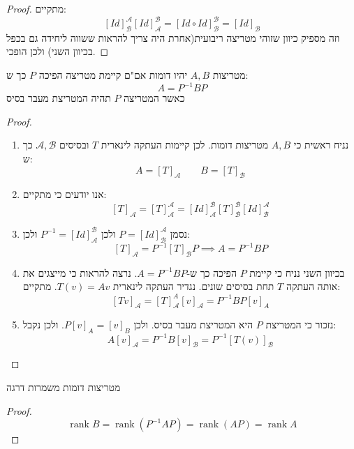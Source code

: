 \documentclass{tstextbook}
\begin{document}
\begin{proof}
מתקיים:
$$[Id]_{\mathcal{B} }^{\mathcal{A} }[Id]_{\mathcal{A} }^{\mathcal{B} }=\left[ Id\circ  Id \right]_{\mathcal{B
} }^{\mathcal{B} }=[Id]_{\mathcal{B} }$$
וזה מספיק כיוון שזוהי מטריצה ריבועית(אחרת היה צריך להראות ששווה ליחידה גם בכפל בכיוון השני) ולכן הופכי.

\end{proof}
\begin{proposition}
מטריצות \(A,B\) יהיו דומות אם"ם קיימת מטריצה הפיכה \(P\) כך ש:
$$A=P ^{-1}BP$$
כאשר המטריצה \(P\) תהיה המטריצת מעבר בסיס

\end{proposition}
\begin{proof}
  \begin{enumerate}
    \item נניח ראשית כי \(A,B\) מטריצות דומות. לכן קיימות העתקה לינארית \(T\) ובסיסים \(\mathcal{A},\mathcal{B}\) כך ש: 
$$A=[T]_{\mathcal{A} }\qquad B=[T]_{\mathcal{B} }$$


    \item אנו יודעים כי מתקיים: 
$$[T]_{\mathcal{A} }=[T]_{\mathcal{A} }^{\mathcal{A} }=[Id]_{\mathcal{A} }^{\mathcal{B} }[T]_{\mathcal{B} }^{\mathcal{B} } [Id]_{\mathcal{B} }^{\mathcal{A} }$$


    \item נסמן \(P=[Id]_{\mathcal{B}}^{\mathcal{A}}\) ולכן \(P ^{-1}=[Id]_{\mathcal{A}}^{\mathcal{B}}\) ולכן: 
$$[T]_{\mathcal{A} }=P ^{-1} [T]_{\mathcal{B} }P\implies A=P ^{-1} BP$$


    \item בכיוון השני נניח כי קיימת \(P\) הפיכה כך ש-\(A=P ^{-1} B P\). נרצה להראות כי מייצגים את אותה העתקה \(T\) תחת בסיסים שונים. נגדיר העתקה לינארית \(T(v)=Av\). מתקיים: 
$$[Tv]_{\mathcal{A} }=[T]_{\mathcal{A} }^{A}[v]_{\mathcal{A} }=P ^{-1}BP [v]_{A}$$


    \item נזכור כי המטריצת \(P\) היא המטריצת מעבר בסיס. ולכן \(P[v]_{A}=[v]_{B}\). ולכן נקבל: 
$$A[v]_{\mathcal{A}}=P^{-1}B[v]_{\mathcal{B}}=P^{-1}[T(v)]_{\mathcal{B}}$$


  \end{enumerate}
\end{proof}
\begin{proposition}
מטריצות דומות משמרות דרגה

\end{proposition}
\begin{proof}
$$\operatorname{rank}B=\operatorname{rank}(P^{-1}A P)=\operatorname{rank}(A P)=\operatorname{rank}A$$

\end{proof}
\end{document}
